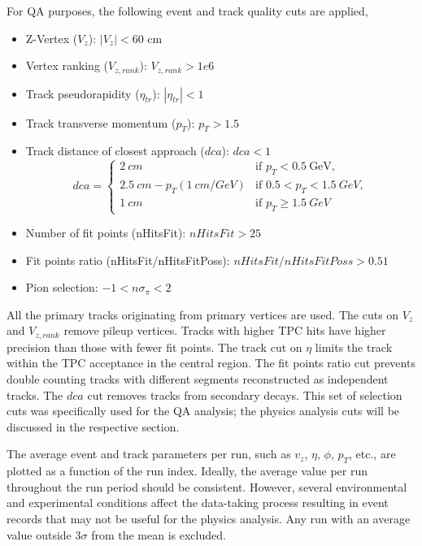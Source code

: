 For QA purposes, the following event and track quality cuts are applied,
\begin{itemize}
    \item Z-Vertex ($V_z$): $|V_z|<60$ cm
    \item Vertex ranking ($V_{z,rank}$): $V_{z,rank}>1e6$
    \item Track pseudorapidity ($\eta_{tr}$): $|\eta_{tr}|<1$
    \item Track transverse momentum ($p_T$): $p_T > 1.5$
    \item Track distance of closest approach ($dca$): $dca < 1$
            \[
            dca = \begin{cases}
            2\ cm & \text{if } p_T < 0.5\ \text{GeV}, \\
            2.5\ cm - p_T (1\ cm /GeV) & \text{if } 0.5< p_T< 1.5\ GeV, \\
            1\ cm & \text{if } p_T \geq 1.5 \ GeV
            \end{cases}
            \]
    
    \item Number of fit points (nHitsFit): $nHitsFit>25$
    \item  Fit points ratio (nHitsFit/nHitsFitPoss): $nHitsFit/nHitsFitPoss>0.51$
    \item Pion selection: $-1<n\sigma_\pi<2$
\end{itemize}


All the primary tracks originating from primary vertices are used. The cuts on $V_z$ and $V_{z,rank}$ remove pileup vertices. Tracks with higher TPC hits have higher precision than those with fewer fit points. The track cut on $\eta$ limits the track within the TPC acceptance in the central region. The fit points ratio cut prevents double counting tracks with different segments reconstructed as independent tracks. The $dca$ cut removes tracks from secondary decays. This set of selection cuts was specifically used for the QA analysis; the physics analysis cuts will be discussed in the respective section. 

The average event and track parameters per run, such as $v_z$, $\eta$, $\phi$, $p_T$, etc.,  are plotted as a function of the run index. Ideally, the average value per run throughout the run period should be consistent. However, several environmental and experimental conditions affect the data-taking process resulting in event records that may not be useful for the physics analysis. Any run with an average value outside $3\sigma$ from the mean is excluded.

